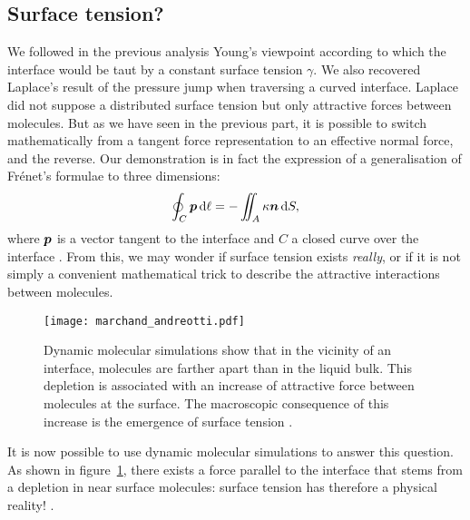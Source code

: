 \subsection{Surface tension?}
We followed in the previous analysis Young's viewpoint according to which the interface would be taut by a constant surface tension $\gamma$. We also recovered Laplace's result of the pressure jump when traversing a curved interface. Laplace did not suppose a distributed surface tension but only attractive forces between molecules. But as we have seen in the previous part, it is possible to switch mathematically from a tangent force representation to an effective normal force, and the reverse. Our demonstration is in fact the expression of a generalisation of Frénet's formulae to three dimensions:
\begin{equation}
\oint_C \bp\,\mathrm d\ell = -\iint_A \kappa \bn\, \mathrm dS,
\end{equation}
where $\bp$ is a vector tangent to the interface and $C$ a closed curve over the interface \citep{Tryggvason2011}. From this, we may wonder if surface tension exists \textit{really}, or if it is not simply a convenient mathematical trick to describe the attractive interactions between molecules.
\begin{figure}[htbp]
\begin{center}
\texttt{[image: marchand\_andreotti.pdf]} 
\end{center}
\caption{Dynamic molecular simulations show that in the vicinity of an interface, molecules are farther apart than in the liquid bulk. This depletion is associated with an increase of attractive force between molecules at the surface. The macroscopic consequence of this increase is the emergence of surface tension \citep{Marchand2011}.}
\label{fig:marchand}
\end{figure}
It is now possible to use dynamic molecular simulations to answer this question. As shown in figure~\ref{fig:marchand}, there exists a force parallel to the interface that stems from a depletion in near surface molecules: surface tension has therefore a physical reality! \citep{Berry1971,Marchand2011}.
 

